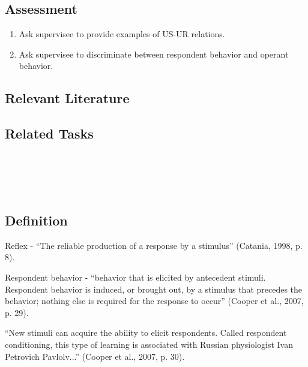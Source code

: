 \subsection{Assessment}
\begin{enumerate}
\item Ask supervisee to provide examples of US-UR relations.
\item Ask supervisee to discriminate between respondent behavior and operant behavior.
%
\end{enumerate}
%
\subsection{Relevant Literature}
\begin{refsection}
\nocite{test,alang2017police,clayton2018black}
\printbibliography[heading=none]
\end{refsection}
%
\subsection{Related Tasks}
\fourFKFourteen{}\\
\fourFKFifteen{}\\
\fourFKSixteen{}\\
%
%
%
%
%
%
\section{\fourFKFourteen{}}
\subsection{Definition} 
Reflex - ``The reliable production of a response by a stimulus'' (Catania, 1998, p. 8).

Respondent behavior - ``behavior that is elicited by antecedent stimuli. Respondent behavior is induced, or brought out, by a stimulus that precedes the behavior; nothing else is required for the response to occur'' (Cooper et al., 2007, p. 29).

``New stimuli can acquire the ability to elicit respondents. Called respondent conditioning, this type of learning is associated with Russian physiologist Ivan Petrovich Pavlolv...'' (Cooper et al., 2007, p. 30).

